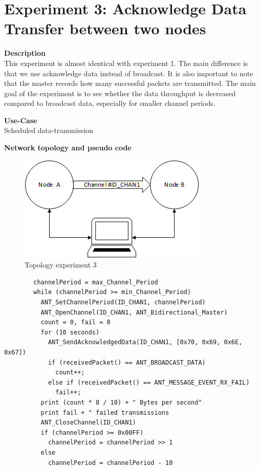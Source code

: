 \section{Experiment 3: Acknowledge Data Transfer between two nodes}
\begin{description} 
	\item{\textbf{Description}} \hfill \\ This experiment is almost identical with experiment 1. The main difference is that we use acknowledge data instead of broadcast. It is also important to note that the master records how many successful packets are transmitted. The main goal of the experiment is to see whether the data throughput is decreased compared to broadcast data, especially for smaller channel periods.
	\item{\textbf{Use-Case}} \hfill \\ Scheduled data-transmission
	\item{\textbf{Network topology and pseudo code}} \hfill \\
	\begin{figure}[H]
		\centering
		\includegraphics[scale=1]{content/images/exp_topo.png}
		\caption{Topology experiment 3}
	\end{figure}
	\begin{code}[H]
		\begin{verbatim}
		channelPeriod = max_Channel_Period
		while (channelPeriod >= min_Channel_Period) 
		  ANT_SetChannelPeriod(ID_CHAN1, channelPeriod)
		  ANT_OpenChannel(ID_CHAN1, ANT_Bidirectional_Master)
		  count = 0, fail = 0
		  for (10 seconds) 
		    ANT_SendAcknowledgedData(ID_CHAN1, [0x70, 0x69, 0x6E, 0x67])		    
		    if (receivedPacket() == ANT_BROADCAST_DATA)		        
		      count++;			  
		    else if (receivedPacket() == ANT_MESSAGE_EVENT_RX_FAIL)
		      fail++;		    
		  print (count * 8 / 10) + " Bytes per second"	  
		  print fail + " failed transmissions
		  ANT_CloseChannel(ID_CHAN1)
		  if (channelPeriod >= 0x00FF)
		    channelPeriod = channelPeriod >> 1
		  else
		    channelPeriod = channelPeriod - 10
		\end{verbatim}
		\caption{Acknowledge data transfer (Master)}\label{lst:mExp3}
	\end{code}
	

\end{description}
